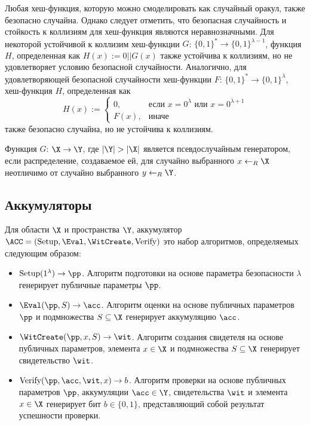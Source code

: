 Любая хеш-функция, которую можно смоделировать как случайный оракул, также безопасно случайна.
Однако следует отметить, что безопасная случайность и стойкость к коллизиям для хеш-функция являются неравнозначными.
Для некоторой устойчивой к коллизим хеш-функции $G$: $\{0, 1\}^* \rightarrow \{0, 1\}^{\lambda - 1}$, функция $H$, определенная как $H(x) := 0 || G(x)$ также устойчива к коллизиям, но не удовлетворяет условию безопасной случайности.
Аналогично, для удовлетворяющей безопасной случайности хеш-функции $F$: $\{0, 1\}^* \rightarrow \{0, 1\}^\lambda$, хеш-функция $H$, определенная как
$$
H(x) :=
\begin{cases}
	0, & \text{если } x = 0^\lambda \text{ или } x = 0^{\lambda + 1} \\
	F(x), & \text{иначе}
\end{cases}
$$
также безопасно случайна, но не устойчива к коллизиям.

\begin{definition}
	Функция $G$: $\X \rightarrow \Y$, где $|\Y| > |\X|$ является псевдослучайным генератором, если распределение, создаваемое ей, для случайно выбранного $x \leftarrow_R \X$ неотличимо от случайно выбранного $y \leftarrow_R \Y$.
\end{definition}

\subsection{Аккумуляторы} %
Для области $\X$ и пространства $\Y$, аккумулятор $\ACC = (\Setup, \Eval, \WitCreate, \Verify)$ это набор алгоритмов, определяемых следующим образом:
\begin{itemize}
	\item $\Setup(1^\lambda) \rightarrow \pp$. Алгоритм подготовки на основе параметра безопасности $\lambda$ генерирует публичные параметры $\pp$.
	\item $\Eval(\pp, S) \rightarrow \acc$. Алгоритм оценки на основе публичных параметров $\pp$ и подмножества $S \subseteq \X$ генерирует аккумуляцию $\acc$.
	\item $\WitCreate(\pp, x, S) \rightarrow \wit$. Алгоритм создания свидетеля на основе публичных параметров, элемента $x \in \X$ и подмножества $S \subseteq \X$ генерирует свидетельство $\wit$.
	\item $\Verify(\pp, \acc, \wit, x) \rightarrow b$. Алгоритм проверки на основе публичных параметров $\pp$, аккумуляции $\acc \in \Y$, свидетельства $\wit$ и элемента $x \in \X$ генерирует бит $b \in \{0, 1\}$, представляющий собой результат успешности проверки.
\end{itemize}

